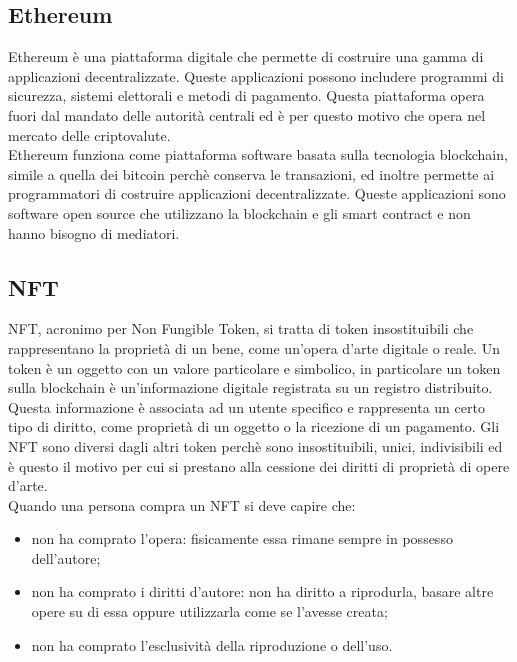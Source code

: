 \subsection{Ethereum}

Ethereum è una piattaforma digitale che permette di costruire una gamma di applicazioni decentralizzate. Queste applicazioni possono includere programmi di sicurezza, sistemi elettorali e metodi di pagamento. Questa piattaforma opera fuori dal mandato delle autorità centrali ed è per questo motivo che opera nel mercato delle criptovalute.\\
Ethereum funziona come piattaforma software basata sulla tecnologia blockchain, simile a quella dei bitcoin perchè conserva le transazioni, ed inoltre permette ai programmatori di costruire applicazioni decentralizzate. Queste applicazioni sono software open source che utilizzano la blockchain e gli smart contract e non hanno bisogno di mediatori. 

\subsection{NFT}

\gls{NFT}, acronimo per Non Fungible Token, si tratta di token insostituibili che rappresentano la proprietà di un bene, come un'opera d'arte digitale o reale. Un token è un oggetto con un valore particolare e simbolico, in particolare un token sulla blockchain è un'informazione digitale registrata su un registro distribuito. Questa informazione è associata ad un utente specifico e rappresenta un certo tipo di diritto, come proprietà di un oggetto o la ricezione di un pagamento. Gli \gls{NFT} sono diversi dagli altri token perchè sono insostituibili, unici, indivisibili ed è questo il motivo per cui si prestano alla cessione dei diritti di proprietà di opere d'arte.\\
Quando una persona compra un \gls{NFT} si deve capire che:
\begin{itemize}
	\item non ha comprato l'opera: fisicamente essa rimane sempre in possesso dell'autore;
	\item non ha comprato i diritti d'autore: non ha diritto a riprodurla, basare altre opere su di essa oppure utilizzarla come se l'avesse creata;
	\item non ha comprato l'esclusività della riproduzione o dell'uso.
\end{itemize}

